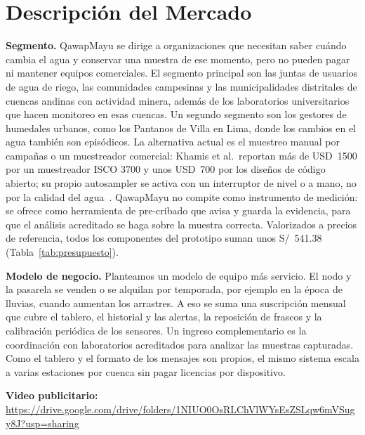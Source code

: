 \section{Descripción del Mercado}
\label{sec:mercado}

\textbf{Segmento.} QawapMayu se dirige a organizaciones que necesitan saber cuándo cambia el agua y conservar una muestra de ese momento, pero no pueden pagar ni mantener equipos comerciales. El segmento principal son las juntas de usuarios de agua de riego, las comunidades campesinas y las municipalidades distritales de cuencas andinas con actividad minera, además de los laboratorios universitarios que hacen monitoreo en esas cuencas. Un segundo segmento son los gestores de humedales urbanos, como los Pantanos de Villa en Lima, donde los cambios en el agua también son episódicos. La alternativa actual es el muestreo manual por campañas o un muestreador comercial: Khamis et al.\ reportan más de USD~1500 por un muestreador ISCO 3700 y unos USD~700 por los diseños de código abierto; su propio autosampler se activa con un interruptor de nivel o a mano, no por la calidad del agua~\cite{khamis2023}. QawapMayu no compite como instrumento de medición: se ofrece como herramienta de pre-cribado que avisa y guarda la evidencia, para que el análisis acreditado se haga sobre la muestra correcta. Valorizados a precios de referencia, todos los componentes del prototipo suman unos S/~541.38 (Tabla~\ref{tab:presupuesto}).

\textbf{Modelo de negocio.} Planteamos un modelo de equipo más servicio. El nodo y la pasarela se venden o se alquilan por temporada, por ejemplo en la época de lluvias, cuando aumentan los arrastres. A eso se suma una suscripción mensual que cubre el tablero, el historial y las alertas, la reposición de frascos y la calibración periódica de los sensores. Un ingreso complementario es la coordinación con laboratorios acreditados para analizar las muestras capturadas. Como el tablero y el formato de los mensajes son propios, el mismo sistema escala a varias estaciones por cuenca sin pagar licencias por dispositivo.

\textbf{Video publicitario:} \url{https://drive.google.com/drive/folders/1NIUO0OsRLChVlWYsEsZSLqw6mVSugy8J?usp=sharing}
